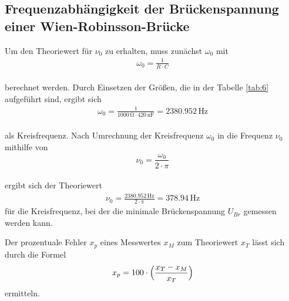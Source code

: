 \subsection{Frequenzabhängigkeit der Brückenspannung einer Wien-Robinsson-Brücke}

Um den Theoriewert für $\nu_{0}$ zu erhalten, muss zunächst $\omega_{0}$ mit 
\begin{align}
\omega_{0} = \frac{1}{R \cdot C} \nonumber
\end{align}
\\ 
berechnet werden. Durch Einsetzen der Größen, die in der Tabelle \ref{tab:6} 
aufgeführt sind, ergibt sich
\begin{align}
\omega_{0} = \frac{1}{1000\, \si{\ohm} \cdot 420\, \si{\nano\farad}} = 2380.952\, \si{\hertz} \nonumber
\end{align}
\\ 
als Kreisfrequenz. Nach Umrechnung der Kreisfrequenz $\omega_{0}$ in die Frequenz $\nu_{0}$ mithilfe von 
\begin{equation}
\nu_{0} = \frac{\omega_{0}}{2 \cdot \pi} \nonumber
\end{equation}
\\
ergibt sich der Theoriewert 
\begin{align}
\nu_{0} = \frac{2380.952\, \si{\hertz}}{2 \cdot \pi} = 378.94\, \si{\hertz} \nonumber
\end{align}
für die Kreisfrequenz, bei der die minimale Brückenspannung $U_{Br}$ gemessen werden kann.

\noindent Der prozentuale Fehler $x_p$ eines
Messwertes $x_M$ zum Theoriewert $x_T$ lässt sich durch
die Formel
\begin{equation}
    x_p=100 \cdot \Bigl(\frac{x_T-x_M}{x_T}\Bigr)
    \label{eq:16}
\end{equation}
\noindent ermitteln.

